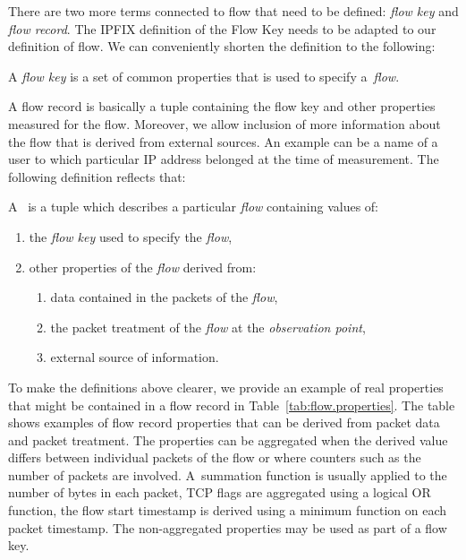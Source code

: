 There are two more terms connected to flow that need to be defined: \emph{flow key} and \emph{flow record}. The IPFIX definition of the Flow Key needs to be adapted to our definition of flow. We can conveniently shorten the definition to the following:

\begin{definition}\label{def:flow-key}

    A \emph{flow key} is a set of common properties that is used to specify a~\emph{flow}.

\end{definition}

A flow record is basically a tuple containing the flow key and other properties measured for the flow. Moreover, we allow inclusion of more information about the flow that is derived from external sources. An example can be a name of a user to which particular IP address belonged at the time of measurement. The following definition reflects that:

\begin{definition}\label{def:flow-record}

    A~\emph{} is a tuple which describes a particular \emph{flow} containing values of:

    \begin{enumerate}
        \item the \emph{flow key} used to specify the \emph{flow},
        \item other properties of the \emph{flow} derived from:
        \begin{enumerate}
            \item data contained in the packets of the \emph{flow},
            \item the packet treatment of the \emph{flow} at the \emph{observation point},
            \item external source of information.
        \end{enumerate}
    \end{enumerate}

\end{definition}

To make the definitions above clearer, we provide an example of real properties that might be contained in a flow record in Table~\ref{tab:flow.properties}. The table shows examples of flow record properties that can be derived from packet data and packet treatment. The properties can be aggregated when the derived value differs between individual packets of the flow or where counters such as the number of packets are involved. A~summation function is usually applied to the number of bytes in each packet, TCP flags are aggregated using a logical OR function, the flow start timestamp is derived using a minimum function on each packet timestamp. The non-aggregated properties may be used as part of a flow key.

